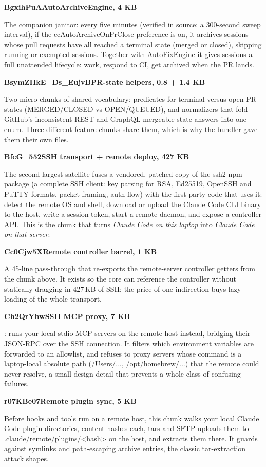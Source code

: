 \documentclass[11pt]{article}
\newcommand{\mono}{\ttfamily}
\newcommand{\reppar}[1]{{\fontsize{10.5}{15.2}\selectfont #1\par}\vspace{8pt}}
\newcommand{\code}[1]{{\mono\small #1}}
\newcommand{\chunkhead}[2]{%
  \vspace{4pt}%
  {\fontsize{10.5}{15.2}\selectfont
   {\mono\bfseries\color{accentink}#1}\;\textbullet\;\textbf{#2}\par}
  \vspace{2pt}}
\begin{document}
\chunkhead{BgxihPuA}{AutoArchiveEngine, 4 KB}
\reppar{The companion janitor: every five minutes (verified in source: a 300-second sweep interval), if the \code{ccAutoArchiveOnPrClose} preference is on, it archives sessions whose pull requests have all reached a terminal state (merged or closed), skipping running or exempted sessions. Together with AutoFixEngine it gives sessions a full unattended lifecycle: work, respond to CI, get archived when the PR lands.}

\chunkhead{BsymZHkE\;+\;Ds\_EujvB}{PR-state helpers, 0.8 + 1.4 KB}
\reppar{Two micro-chunks of shared vocabulary: predicates for terminal versus open PR states (\code{MERGED}/\code{CLOSED} vs \code{OPEN}/\code{QUEUED}), and normalizers that fold GitHub's inconsistent REST and GraphQL mergeable-state answers into one enum. Three different feature chunks share them, which is why the bundler gave them their own files.}

\chunkhead{BfcG\_552}{SSH transport + remote deploy, 427 KB}
\reppar{The second-largest satellite fuses a vendored, patched copy of the \code{ssh2} npm package (a complete SSH client: key parsing for RSA, Ed25519, OpenSSH and PuTTY formats, packet framing, auth flow) with the first-party code that uses it: detect the remote OS and shell, download or upload the Claude Code CLI binary to the host, write a session token, start a remote daemon, and expose a controller API. This is the chunk that turns \textit{Claude Code on this laptop} into \textit{Claude Code on that server}.}

\chunkhead{Cc0Cjw5X}{Remote controller barrel, 1 KB}
\reppar{A 45-line pass-through that re-exports the remote-server controller getters from the chunk above. It exists so the core can reference the controller without statically dragging in 427\,KB of SSH; the price of one indirection buys lazy loading of the whole transport.}

\chunkhead{Ch2QrYhw}{SSH MCP proxy, 7 KB}
\reppar{\code{SshMcpServerManager}: runs your local stdio MCP servers on the remote host instead, bridging their JSON-RPC over the SSH connection. It filters which environment variables are forwarded to an allowlist, and refuses to proxy servers whose command is a laptop-local absolute path (\code{/Users/...}, \code{/opt/homebrew/...}) that the remote could never resolve, a small design detail that prevents a whole class of confusing failures.}

\chunkhead{r07KBe07}{Remote plugin sync, 5 KB}
\reppar{Before hooks and tools run on a remote host, this chunk walks your local Claude Code plugin directories, content-hashes each, tars and SFTP-uploads them to \code{.claude/remote/plugins/<hash>} on the host, and extracts them there. It guards against symlinks and path-escaping archive entries, the classic tar-extraction attack shapes.}
\end{document}
